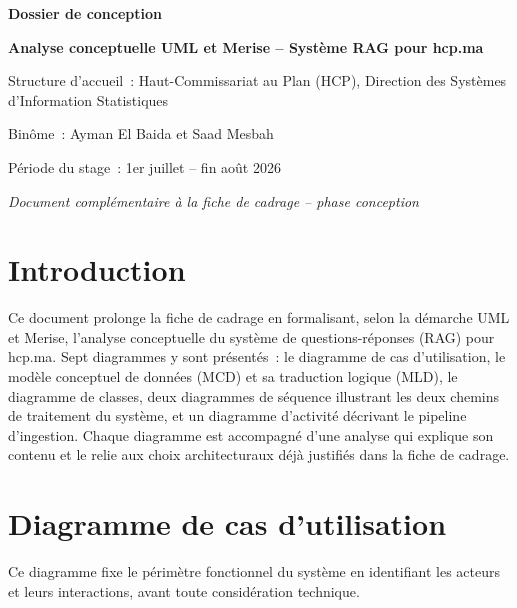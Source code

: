 \documentclass[11pt,a4paper]{article}
\begin{document}
\begin{titlepage}
\centering
\vspace*{2cm}
{\Huge\bfseries\color{navy} Dossier de conception\par}
\vspace{0.5cm}
{\Large\bfseries\color{gold} Analyse conceptuelle UML et Merise -- Syst\`eme RAG pour hcp.ma\par}
\vspace{1.5cm}
{\large\color{greytext} Structure d'accueil~: Haut-Commissariat au Plan (HCP), Direction des Syst\`emes d'Information Statistiques\par}
\vspace{0.3cm}
{\large\color{greytext} Bin\^ome~: Ayman El Baida et Saad Mesbah\par}
\vspace{0.3cm}
{\large\color{greytext} P\'eriode du stage~: 1er juillet -- fin ao\^ut 2026\par}
\vspace{0.3cm}
{\large\itshape\color{greytext} Document compl\'ementaire \`a la fiche de cadrage -- phase conception\par}
\vfill
\end{titlepage}

\tableofcontents
\newpage

\section{Introduction}
Ce document prolonge la fiche de cadrage en formalisant, selon la d\'emarche UML et Merise, l'analyse conceptuelle du syst\`eme de questions-r\'eponses (RAG) pour hcp.ma. Sept diagrammes y sont pr\'esent\'es~: le diagramme de cas d'utilisation, le mod\`ele conceptuel de donn\'ees (MCD) et sa traduction logique (MLD), le diagramme de classes, deux diagrammes de s\'equence illustrant les deux chemins de traitement du syst\`eme, et un diagramme d'activit\'e d\'ecrivant le pipeline d'ingestion. Chaque diagramme est accompagn\'e d'une analyse qui explique son contenu et le relie aux choix architecturaux d\'ej\`a justifi\'es dans la fiche de cadrage.

\section{Diagramme de cas d'utilisation}
Ce diagramme fixe le p\'erim\`etre fonctionnel du syst\`eme en identifiant les acteurs et leurs interactions, avant toute consid\'eration technique.
\end{document}
